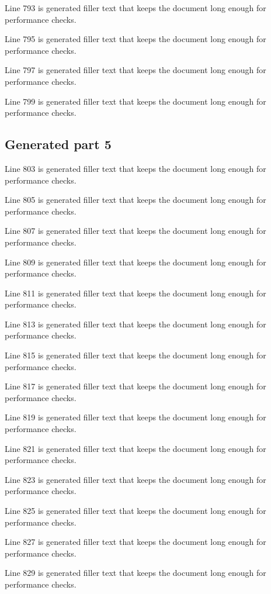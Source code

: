 Line 793 is generated filler text that keeps the document long enough for performance checks.

Line 795 is generated filler text that keeps the document long enough for performance checks.

Line 797 is generated filler text that keeps the document long enough for performance checks.

Line 799 is generated filler text that keeps the document long enough for performance checks.

\subsection{Generated part 5}

Line 803 is generated filler text that keeps the document long enough for performance checks.

Line 805 is generated filler text that keeps the document long enough for performance checks.

Line 807 is generated filler text that keeps the document long enough for performance checks.

Line 809 is generated filler text that keeps the document long enough for performance checks.

Line 811 is generated filler text that keeps the document long enough for performance checks.

Line 813 is generated filler text that keeps the document long enough for performance checks.

Line 815 is generated filler text that keeps the document long enough for performance checks.

Line 817 is generated filler text that keeps the document long enough for performance checks.

Line 819 is generated filler text that keeps the document long enough for performance checks.

Line 821 is generated filler text that keeps the document long enough for performance checks.

Line 823 is generated filler text that keeps the document long enough for performance checks.

Line 825 is generated filler text that keeps the document long enough for performance checks.

Line 827 is generated filler text that keeps the document long enough for performance checks.

Line 829 is generated filler text that keeps the document long enough for performance checks.


